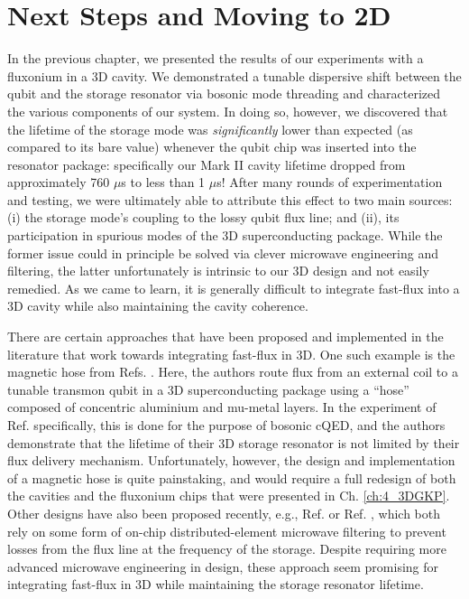 \chapter{Next Steps and Moving to 2D\label{ch:5_2DGKP}}


In the previous chapter, we presented the results of our experiments with a fluxonium in a 3D cavity. We demonstrated a tunable dispersive shift between the qubit and the storage resonator via bosonic mode threading and characterized the various components of our system. In doing so, however, we discovered that the lifetime of the storage mode was \textit{significantly} lower than expected (as compared to its bare value) whenever the qubit chip was inserted into the resonator package: specifically our Mark II cavity lifetime dropped from approximately 760 $\mu$s to less than 1 $\mu$s! After many rounds of experimentation and testing, we were ultimately able to attribute this effect to two main sources: (i) the storage mode's coupling to the lossy qubit flux line; and (ii), its participation in spurious modes of the 3D superconducting package. While the former issue could in principle be solved via clever microwave engineering and filtering, the latter unfortunately is intrinsic to our 3D design and not easily remedied. As we came to learn, it is generally difficult to integrate fast-flux into a 3D cavity while also maintaining the cavity coherence. 

There are certain approaches that have been proposed and implemented in the literature that work towards integrating fast-flux in 3D. One such example is the magnetic hose from Refs. \cite{gargiulo2021fast,valadares2023demand}. Here, the authors route flux from an external coil to a tunable transmon qubit in a 3D superconducting package using a ``hose'' composed of concentric aluminium and mu-metal layers. In the experiment of Ref. \cite{valadares2023demand} specifically, this is done for the purpose of bosonic cQED, and the authors demonstrate that the lifetime of their 3D storage resonator is not limited by their flux delivery mechanism. Unfortunately, however, the design and implementation of a magnetic hose is quite painstaking, and would require a full redesign of both the cavities and the fluxonium chips that were presented in Ch. \ref{ch:4_3DGKP}. Other designs have also been proposed recently, e.g., Ref. \cite{hutin2024monitoring} or Ref. \cite{maiti2024ancilla}, which both rely on some form of on-chip distributed-element microwave filtering to prevent losses from the flux line at the frequency of the storage. Despite requiring more advanced microwave engineering in design, these approach seem promising for integrating fast-flux in 3D while maintaining the storage resonator lifetime. 

